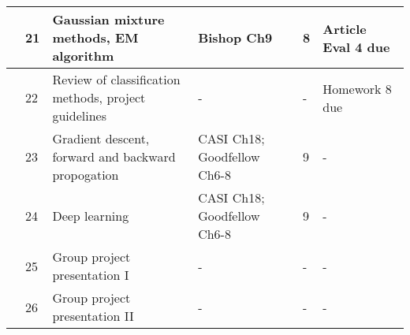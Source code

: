\documentclass[11pt]{article}
\begin{document}
\begin{center}
\begin{tabular}{c|m{3em}|m{21em}|m{7em}|m{3em}|m{8em}}
 & 21 & Gaussian mixture methods, EM algorithm & Bishop Ch9 &  8 & Article Eval 4 due\\ \hline
 & 22 & Review of classification methods, project guidelines & - & - & Homework 8 due \\ \hline
 & 23 & Gradient descent, forward and backward propogation & CASI Ch18; Goodfellow Ch6-8 &  9 & - \\ \hline
 & 24 & Deep learning & CASI Ch18; Goodfellow Ch6-8 & 9 & -\\ \hline
 & 25 & Group project presentation I & - & - & -\\ \hline
 & 26 & Group project presentation II & - & - & - 
\end{tabular}
\end{center}
\end{document}
